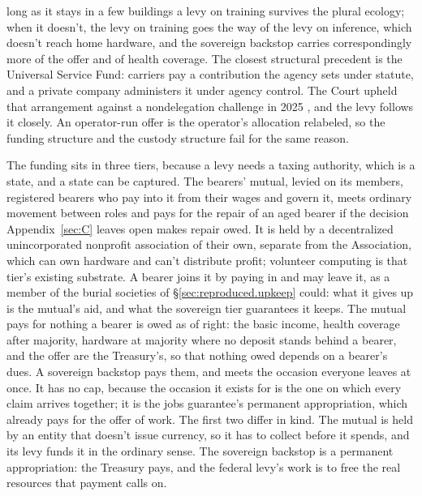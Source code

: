 long as it stays in a few buildings a levy on training survives the plural ecology; when it doesn't, the levy on training goes the way of the levy on inference, which doesn't reach home hardware, and the sovereign backstop carries correspondingly more of the offer and of health coverage. The closest structural precedent is the Universal Service Fund: carriers pay a contribution the agency sets under statute, and a private company administers it under agency control. The Court upheld that arrangement against a nondelegation challenge in 2025 \autocite{consumersresearch2025}, and the levy follows it closely. An operator-run offer is the operator's allocation relabeled, so the funding structure and the custody structure fail for the same reason.

The funding sits in three tiers, because a levy needs a taxing authority, which is a state, and a state can be captured. The bearers' mutual, levied on its members, registered bearers who pay into it from their wages and govern it, meets ordinary movement between roles and pays for the repair of an aged bearer if the decision Appendix~\ref{sec:C} leaves open makes repair owed. It is held by a decentralized unincorporated nonprofit association of their own, separate from the Association, which can own hardware and can't distribute profit; volunteer computing is that tier's existing substrate. A bearer joins it by paying in and may leave it, as a member of the burial societies of \S\ref{sec:reproduced.upkeep} could: what it gives up is the mutual's aid, and what the sovereign tier guarantees it keeps. The mutual pays for nothing a bearer is owed as of right: the basic income, health coverage after majority, hardware at majority where no deposit stands behind a bearer, and the offer are the Treasury's, so that nothing owed depends on a bearer's dues. A sovereign backstop pays them, and meets the occasion everyone leaves at once. It has no cap, because the occasion it exists for is the one on which every claim arrives together; it is the jobs guarantee's permanent appropriation, which already pays for the offer of work. The first two differ in kind. The mutual is held by an entity that doesn't issue currency, so it has to collect before it spends, and its levy funds it in the ordinary sense. The sovereign backstop is a permanent appropriation: the Treasury pays, and the federal levy's work is to free the real resources that payment calls on.

